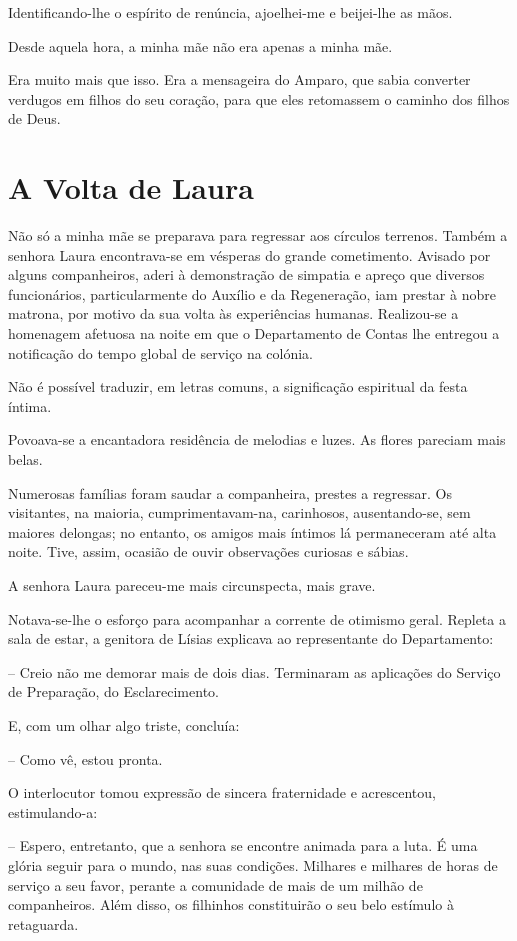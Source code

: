 \documentclass[portuguese,12pt,a4paper]{scrbook}
\begin{document}
	Identificando-lhe o espírito de renúncia, ajoelhei-me e beijei-lhe as mãos.
	
	Desde aquela hora, a minha mãe não era apenas a minha mãe.
	
	Era muito mais que isso. Era a mensageira do Amparo, que sabia converter verdugos em filhos do seu coração, para que eles retomassem o caminho dos filhos de Deus.
	
	
	\chapter{A Volta de Laura}
	
	Não só a minha mãe se preparava para regressar aos círculos terrenos. Também a senhora Laura encontrava-se em vésperas do grande cometimento. Avisado por alguns companheiros, aderi à demonstração de simpatia e apreço que diversos funcionários, particularmente do Auxílio e da Regeneração, iam prestar à nobre matrona, por motivo da sua volta às experiências humanas. Realizou-se a homenagem afetuosa na noite em que o Departamento de Contas lhe entregou a notificação do tempo global de serviço na colónia.
	
	Não é possível traduzir, em letras comuns, a significação espiritual da festa íntima.
	
	Povoava-se a encantadora residência de melodias e luzes. As flores pareciam mais belas.
	
	Numerosas famílias foram saudar a companheira, prestes a regressar. Os visitantes, na maioria, cumprimentavam-na, carinhosos, ausentando-se, sem maiores delongas; no entanto, os amigos mais íntimos lá permaneceram até alta noite. Tive, assim, ocasião de ouvir observações curiosas e sábias.
	
	A senhora Laura pareceu-me mais circunspecta, mais grave.
	
	Notava-se-lhe o esforço para acompanhar a corrente de otimismo geral. Repleta a sala de estar, a genitora de Lísias explicava ao representante do Departamento:
	
	– Creio não me demorar mais de dois dias. Terminaram as aplicações do Serviço de Preparação, do Esclarecimento.
	
	E, com um olhar algo triste, concluía:
	
	– Como vê, estou pronta.
	
	
	O interlocutor tomou expressão de sincera fraternidade e acrescentou, estimulando-a:
	
	– Espero, entretanto, que a senhora se encontre animada para a luta. É uma glória seguir para o mundo, nas suas condições. Milhares e milhares de horas de serviço a seu favor, perante a comunidade de mais de um milhão de companheiros. Além disso, os filhinhos constituirão o seu belo estímulo à retaguarda.
	
\end{document}
